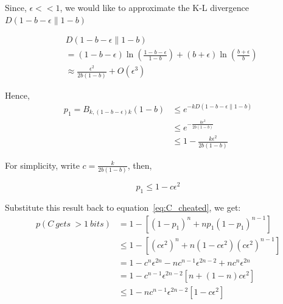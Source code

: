 \documentclass[%
 reprint,
superscriptaddress,
 amsmath,amssymb,
 aps,
]{revtex4-2}
\begin{document}
Since, $\epsilon<<1$, we would like to approximate the K-L divergence $D(1-b-\epsilon\|1-b)$

\begin{equation}
\begin{split}
    &D(1-b-\epsilon\|1-b)\\&=(1-b-\epsilon)\ln\left(\frac{1-b-\epsilon}{1-b}\right)+(b+\epsilon)\ln\left(\frac{b+\epsilon}{b}\right)\\
    &\approx \frac{\epsilon^2}{2b(1-b)}+O(\epsilon^3)
    \end{split}
\end{equation}

Hence, 
\begin{equation}
\begin{split}
p_1=B_{k, (1-b-\epsilon)k}(1-b)&\le e^{-kD\left(1-b-\epsilon\|1-b\right)}\\
&\le e^{-\frac{k\epsilon^2}{2b(1-b)}}\\
&\le 1-\frac{k\epsilon^2}{2b(1-b)}
\end{split}
\end{equation}

For simplicity, write $c=\frac{k}{2b(1-b)}$, then,

\begin{equation}
    p_1\le 1 - c\epsilon^2
\end{equation}

Substitute this result back to equation~\ref{eq:C_cheated}, we get:
\begin{equation}
    \begin{split}
        p(C\ gets\ > 1\ bits) &=1-\left[(1-p_1)^n+np_1(1-p_1)^{n-1}\right]\\
        &\le 1-\left[(c\epsilon^2)^n+n(1-c\epsilon^2)(c\epsilon^2)^{n-1}\right]\\
        &=1-c^n\epsilon^{2n}-nc^{n-1}\epsilon^{2n-2}+nc^n\epsilon^{2n}\\
        &=1-c^{n-1}\epsilon^{2n-2}\left[n+(1-n)c\epsilon^2\right]\\
        &\le 1-nc^{n-1}\epsilon^{2n-2}\left[1-c\epsilon^2\right]\\
    \end{split}
    \label{eq:upper_bound_C_cheated}
\end{equation}
\end{document}
